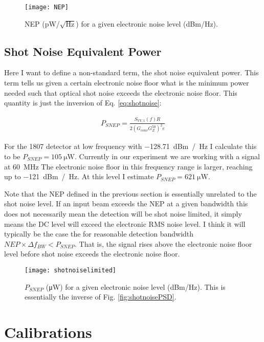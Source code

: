 \documentclass[12pt]{article}
\begin{document}
\begin{figure}[H]
\centering 
\texttt{[image: NEP]}
\caption{NEP (pW/$\sqrt{\si{\Hz}}$) for a given electronic noise level (dBm/Hz).}
\end{figure}

\subsection{Shot Noise Equivalent Power}

Here I want to define a non-standard term, the shot noise equivalent power.
This term tells us given a certain electronic noise floor what is the minimum power needed such that optical shot noise exceeds the electronic noise floor.
This quantity is just the inversion of Eq. \ref{eq:shotnoise}:

\begin{align}
P_{SNEP} = \frac{S_{VV,1}(f)R}{2\left(G_{conv}G_Z^{50}\right)^2 e}
\end{align}

For the 1807 detector at low frequency with \SI{-128.71}{dBm / \Hz} I calculate this to be $P_{SNEP} = \SI{105}{\micro \watt}$.
Currently in our experiment we are working with a signal at \SI{60}{\mega \Hz}
The electronic noise floor in this frequency range is larger, reaching up to \SI{-121}{dBm / \Hz}.
At this level I estimate $P_{SNEP} = \SI{621}{\micro \watt}$.

Note that the NEP defined in the previous section is essentially unrelated to the shot noise level.
If an input beam exceeds the NEP at a given bandwidth this does not necessarily mean the detection will be shot noise limited, it simply means the DC level will exceed the electronic RMS noise level.
I think it will typically be the case the for reasonable detection bandwidth $NEP \times \Delta f_{BW} < P_{SNEP}$.
That is, the signal rises above the electronic noise floor level before shot noise exceeds the electronic noise floor.

\begin{figure}[h!]
\centering
\texttt{[image: shotnoiselimited]}
\caption{$P_{SNEP}$ (\si{\micro\watt}) for a given electronic noise level (dBm/Hz). This is essentially the inverse of Fig. \ref{fig:shotnoisePSD}.}
\end{figure}

\section{Calibrations}
\end{document}
